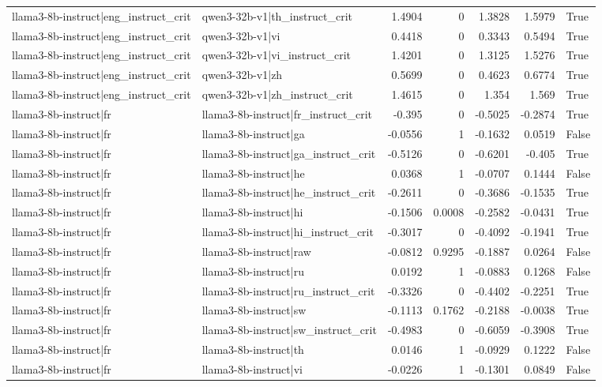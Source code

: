 \begin{table}
\begin{tabular}{l l r r r r l}
llama3-8b-instruct|eng_instruct_crit & qwen3-32b-v1|th_instruct_crit & 1.4904 & 0 & 1.3828 & 1.5979 & True \\
llama3-8b-instruct|eng_instruct_crit & qwen3-32b-v1|vi & 0.4418 & 0 & 0.3343 & 0.5494 & True \\
llama3-8b-instruct|eng_instruct_crit & qwen3-32b-v1|vi_instruct_crit & 1.4201 & 0 & 1.3125 & 1.5276 & True \\
llama3-8b-instruct|eng_instruct_crit & qwen3-32b-v1|zh & 0.5699 & 0 & 0.4623 & 0.6774 & True \\
llama3-8b-instruct|eng_instruct_crit & qwen3-32b-v1|zh_instruct_crit & 1.4615 & 0 & 1.354 & 1.569 & True \\
llama3-8b-instruct|fr & llama3-8b-instruct|fr_instruct_crit & -0.395 & 0 & -0.5025 & -0.2874 & True \\
llama3-8b-instruct|fr & llama3-8b-instruct|ga & -0.0556 & 1 & -0.1632 & 0.0519 & False \\
llama3-8b-instruct|fr & llama3-8b-instruct|ga_instruct_crit & -0.5126 & 0 & -0.6201 & -0.405 & True \\
llama3-8b-instruct|fr & llama3-8b-instruct|he & 0.0368 & 1 & -0.0707 & 0.1444 & False \\
llama3-8b-instruct|fr & llama3-8b-instruct|he_instruct_crit & -0.2611 & 0 & -0.3686 & -0.1535 & True \\
llama3-8b-instruct|fr & llama3-8b-instruct|hi & -0.1506 & 0.0008 & -0.2582 & -0.0431 & True \\
llama3-8b-instruct|fr & llama3-8b-instruct|hi_instruct_crit & -0.3017 & 0 & -0.4092 & -0.1941 & True \\
llama3-8b-instruct|fr & llama3-8b-instruct|raw & -0.0812 & 0.9295 & -0.1887 & 0.0264 & False \\
llama3-8b-instruct|fr & llama3-8b-instruct|ru & 0.0192 & 1 & -0.0883 & 0.1268 & False \\
llama3-8b-instruct|fr & llama3-8b-instruct|ru_instruct_crit & -0.3326 & 0 & -0.4402 & -0.2251 & True \\
llama3-8b-instruct|fr & llama3-8b-instruct|sw & -0.1113 & 0.1762 & -0.2188 & -0.0038 & True \\
llama3-8b-instruct|fr & llama3-8b-instruct|sw_instruct_crit & -0.4983 & 0 & -0.6059 & -0.3908 & True \\
llama3-8b-instruct|fr & llama3-8b-instruct|th & 0.0146 & 1 & -0.0929 & 0.1222 & False \\
llama3-8b-instruct|fr & llama3-8b-instruct|vi & -0.0226 & 1 & -0.1301 & 0.0849 & False \\

\end{tabular}
\end{table}
